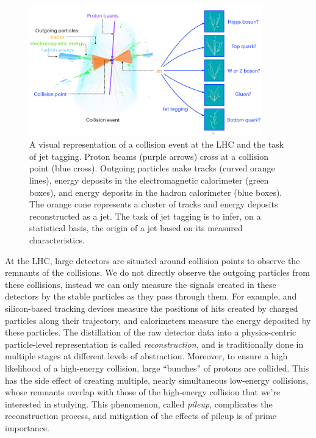\documentclass[11pt,letterpaper,notitlepage]{article}
\begin{document}
\begin{figure}[htb!]
    \centering
    \includegraphics[width=0.9\textwidth]{jet_tagging.pdf}
    \caption{
        A visual representation of a collision event at the LHC and the task of jet tagging.
        Proton beams (purple arrows) cross at a collision point (blue cross).
        Outgoing particles make tracks (curved orange lines), energy deposits in the electromagnetic calorimeter (green boxes), and energy deposits in the hadron calorimeter (blue boxes).
        The orange cone represents a cluster of tracks and energy deposits reconstructed as a jet.
        The task of jet tagging is to infer, on a statistical basis, the origin of a jet based on its measured characteristics.
        \label{fig:jet_tagging}
    }
\end{figure}

At the LHC, large detectors are situated around collision points to observe the remnants of the collisions.
We do not directly observe the outgoing particles from these collisions, instead we can only measure the signals created in these detectors by the stable particles as they pass through them.
For example, and silicon-based tracking devices measure the positions of hits created by charged particles along their trajectory, and calorimeters measure the energy deposited by these particles.
The distillation of the raw detector data into a physics-centric particle-level representation is called \emph{reconstruction}, and is traditionally done in multiple stages at different levels of abstraction.
Moreover, to ensure a high likelihood of a high-energy collision, large ``bunches'' of protons are collided.
This has the side effect of creating multiple, nearly simultaneous low-energy collisions, whose remnants overlap with those of the high-energy collision that we're interested in studying.
This phenomenon, called \emph{pileup}, complicates the reconstruction process, and mitigation of the effects of pileup is of prime importance.
\end{document}
